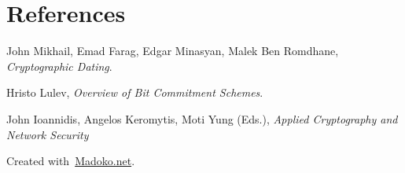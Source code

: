 \documentclass{article}
\begin{document}
\section*{References}\label{sec-references}%

\noindent{}John Mikhail, Emad Farag, Edgar Minasyan, Malek Ben Romdhane, \emph{Cryptographic Dating}.%

Hristo Lulev, \emph{Overview of Bit Commitment Schemes}.%

John Ioannidis, Angelos Keromytis, Moti Yung (Eds.), \emph{Applied Cryptography and Network Security}%

\begin{mdbmargintb}{4em}{}%
\begin{mdflushright}%
{\tiny{}Created with~\href{https://www.madoko.net}{Madoko.net}.}%
\end{mdflushright}%
\end{mdbmargintb}%
\end{document}
